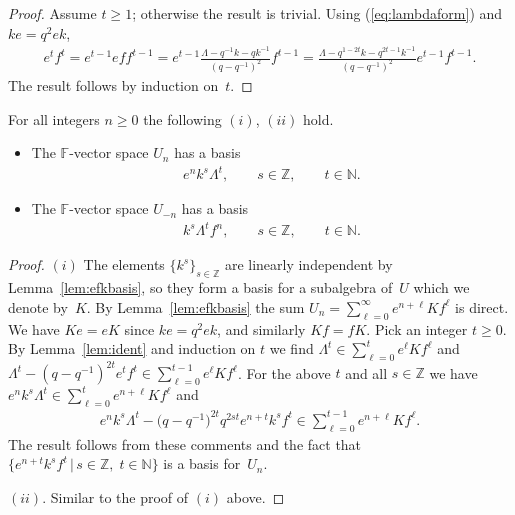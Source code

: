 \begin{proof}
Assume $t\geq 1$; otherwise the result is trivial.
Using
(\ref{eq:lambdaform}) and $ke=q^2ek$,
\begin{gather*}
e^t f^t  =  e^{t-1} ef f^{t-1}
= e^{t-1} \frac{\Lambda -q^{-1}k-qk^{-1}}{(q-q^{-1})^2}f^{t-1}
 = \frac{\Lambda -q^{1-2t}k-q^{2t-1}k^{-1}}{(q-q^{-1})^2}e^{t-1}f^{t-1}.
\end{gather*}
The result follows by induction on~$t$.
\end{proof}



\begin{Lemma}
\label{lem:basisalt}
For all integers $n\geq 0$ the following $(i)$, $(ii)$ hold.
\begin{itemize}\itemsep=0pt
\item[$(i)$]
The $\mathbb F$-vector space $U_n$ has a basis
\begin{gather*}
e^n k^s \Lambda^t,
 \qquad s\in \mathbb Z, \qquad   t\in \mathbb N.
\end{gather*}
\item[$(ii)$]
The $\mathbb F$-vector space $U_{-n}$ has a basis
\begin{gather*}
k^s \Lambda^t  f^n,
 \qquad s\in \mathbb Z, \qquad   t\in \mathbb N.
\end{gather*}
\end{itemize}
\end{Lemma}

\begin{proof}
$(i)$ The elements
$\lbrace k^s\rbrace_{s \in \mathbb Z}$ are linearly
independent
by
Lemma~\ref{lem:efkbasis}, so they form
a basis for a subalgebra of~$U$ which we denote by~$K$.
By Lemma~\ref{lem:efkbasis}
the sum $U_n=\sum\limits_{\ell=0}^\infty e^{n+\ell} K f^\ell$ is direct.
We have
$Ke=eK$ since
$ke=q^2ek$, and
similarly $Kf=fK$.
Pick an integer $t\geq 0$.
By Lemma~\ref{lem:ident}  and induction on $t$
we f\/ind
$ \Lambda^t \in
\sum\limits_{\ell=0}^t e^\ell Kf^\ell$
and
$\Lambda^t -(q-q^{-1})^{2t} e^t f^t
\in
\sum\limits_{\ell=0}^{t-1} e^{\ell} K f^\ell $.
For the above $t$ and all $s\in \mathbb Z$
we have $e^n k^s \Lambda^t  \in
\sum\limits_{\ell=0}^t e^{n+\ell} K f^\ell $ and
\begin{gather*}
e^n k^s \Lambda^t - \big(q-q^{-1}\big)^{2t} q^{2st}e^{n+t}k^s f^t \in
\sum_{\ell=0}^{t-1} e^{n+\ell} K f^\ell.
\end{gather*}
The result follows
from these comments
and the fact that
$\lbrace
e^{n+t}k^s f^t \,|\, s\in \mathbb Z,\;t\in \mathbb N\rbrace$ is a basis for~$U_n$.

$(ii)$. Similar to the proof of $(i)$ above.
\end{proof}




